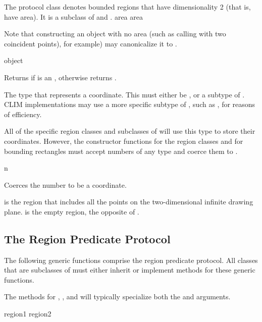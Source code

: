 
The protocol class  denotes bounded regions that have dimensionality 2
(that is, have area).  It is a subclass of  and .
 {area} {area}

Note that constructing an  object with no area (such as calling
 with two coincident points), for example) may canonicalize
it to .

 {object}

Returns  if  is an , otherwise returns
.


The type that represents a coordinate.  This must either be , or a
subtype of .  CLIM implementations may use a more specific subtype of
, such as , for reasons of efficiency.

All of the specific region classes and subclasses of 
will use this type to store their coordinates.  However, the constructor
functions for the region classes and for bounding rectangles must accept numbers
of any type and coerce them to .

 {n}

Coerces the number  to be a coordinate.



 is the region that includes all the points on the
two-dimensional infinite drawing plane.  is the empty region, the
opposite of .


\subsection {The Region Predicate Protocol}

The following generic functions comprise the region predicate protocol.  All
classes that are subclasses of  must either inherit or implement
methods for these generic functions.

The methods for , , and
 will typically specialize both the 
and  arguments.


 {region1 region2}

